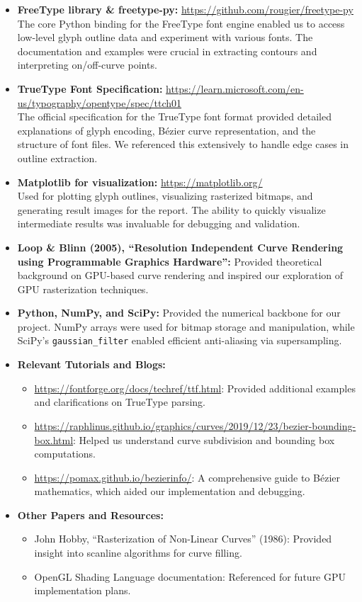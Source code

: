 \documentclass[11pt]{article}
\begin{document}
\begin{itemize}[leftmargin=*,nosep]
    \item \textbf{FreeType library \& freetype-py:} \url{https://github.com/rougier/freetype-py}\\
    The core Python binding for the FreeType font engine enabled us to access low-level glyph outline data and experiment with various fonts. The documentation and examples were crucial in extracting contours and interpreting on/off-curve points.
    \item \textbf{TrueType Font Specification:} \url{https://learn.microsoft.com/en-us/typography/opentype/spec/ttch01}\\
    The official specification for the TrueType font format provided detailed explanations of glyph encoding, Bézier curve representation, and the structure of font files. We referenced this extensively to handle edge cases in outline extraction.
    \item \textbf{Matplotlib for visualization:} \url{https://matplotlib.org/}\\
    Used for plotting glyph outlines, visualizing rasterized bitmaps, and generating result images for the report. The ability to quickly visualize intermediate results was invaluable for debugging and validation.
    \item \textbf{Loop \& Blinn (2005), ``Resolution Independent Curve Rendering using Programmable Graphics Hardware'':} Provided theoretical background on GPU-based curve rendering and inspired our exploration of GPU rasterization techniques.
    \item \textbf{Python, NumPy, and SciPy:} Provided the numerical backbone for our project. NumPy arrays were used for bitmap storage and manipulation, while SciPy's \texttt{gaussian\_filter} enabled efficient anti-aliasing via supersampling.
    \item \textbf{Relevant Tutorials and Blogs:}
    \begin{itemize}[nosep]
        \item \url{https://fontforge.org/docs/techref/ttf.html}: Provided additional examples and clarifications on TrueType parsing.
        \item \url{https://raphlinus.github.io/graphics/curves/2019/12/23/bezier-bounding-box.html}: Helped us understand curve subdivision and bounding box computations.
        \item \url{https://pomax.github.io/bezierinfo/}: A comprehensive guide to Bézier mathematics, which aided our implementation and debugging.
    \end{itemize}
    \item \textbf{Other Papers and Resources:}
    \begin{itemize}[nosep]
        \item John Hobby, ``Rasterization of Non-Linear Curves'' (1986): Provided insight into scanline algorithms for curve filling.
        \item OpenGL Shading Language documentation: Referenced for future GPU implementation plans.
    \end{itemize}
\end{itemize}
\par
\end{document}
